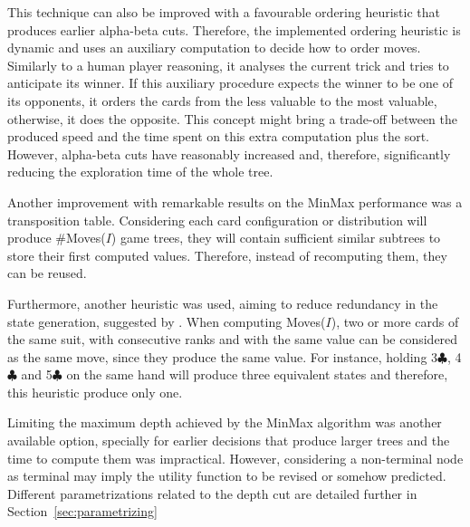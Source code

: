 This technique can also be improved with a favourable ordering heuristic that produces earlier alpha-beta cuts.
Therefore, the implemented ordering heuristic is dynamic and uses an auxiliary computation to decide how to order moves.
Similarly to a human player reasoning, it analyses the current trick and tries to anticipate its winner.
If this auxiliary procedure expects the winner to be one of its opponents, it orders the cards from the less valuable to the most valuable, otherwise, it does the opposite.
This concept might bring a trade-off between the produced speed and the time spent on this extra computation plus the sort.
However, alpha-beta cuts have reasonably increased and, therefore, significantly reducing the exploration time of the whole tree.

Another improvement with remarkable results on the MinMax performance was a transposition table.
Considering each card configuration or distribution will produce \#Moves($I$) game trees, they will contain sufficient similar subtrees to store their first computed values.
Therefore, instead of recomputing them, they can be reused.

Furthermore, another heuristic was used, aiming to reduce redundancy in the state generation, suggested by \citet{Buro}.
When computing Moves($I$), two or more cards of the same suit, with consecutive ranks and with the same value can be considered as the same move, since they produce the same value.
For instance, holding 3$\clubsuit$, 4$\clubsuit$ and 5$\clubsuit$ on the same hand will produce three equivalent states and therefore, this heuristic produce only one.

Limiting the maximum depth achieved by the MinMax algorithm was another available option, specially for earlier decisions that produce larger trees and the time to compute them was impractical.
However, considering a non-terminal node as terminal may imply the utility function to be revised or somehow predicted.
Different parametrizations related to the depth cut are detailed further in Section~\ref{sec:parametrizing}












